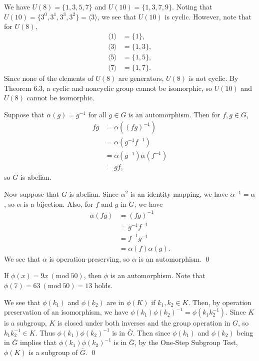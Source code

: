 \documentclass[11pt,letterpaper]{article}
\newcommand{\Mod}[1]{\ (\mathrm{mod}\ #1)}
\begin{document}
\begin{enumerate}
{\item[\textbf{6.4}] We have $U(8)=\{1,3,5,7\}$ and $U(10)=\{1,3,7,9\}$. Noting that $U(10)=\{3^0,3^1,3^3,3^2\}=\langle 3 \rangle$, we see that $U(10)$ is cyclic.
However, note that for $U(8)$,
\begin{align*}
    \langle 1 \rangle &= \{1\}, \\
    \langle 3 \rangle &= \{1,3\}, \\
    \langle 5 \rangle &= \{1,5\}, \\
    \langle 7 \rangle &= \{1,7\}.
\end{align*}
Since none of the elements of $U(8)$ are generators, $U(8)$ is not cyclic. By Theorem 6.3, a cyclic and noncyclic group cannot be isomorphic, so $U(10)$ and $U(8)$ cannot be isomorphic.


\item[\textbf{6.12}] Suppose that $\alpha(g)=g^{-1}$ for all $g\in{G}$ is an automorphism. Then for $f,g\in{G}$,
\begin{align*}
    fg &= \alpha((fg)^{-1}) \\
    &= \alpha(g^{-1}f^{-1}) \\
    &= \alpha(g^{-1})\alpha(f^{-1}) \\
    &= gf,
\end{align*}
so $G$ is abelian.

Now suppose that $G$ is abelian. Since $\alpha^2$ is an identity mapping, we have $\alpha^{-1}=\alpha$, so $\alpha$ is a bijection. Also, for $f$ and $g$ in $G$, we have
\begin{align*}
\alpha(fg) &= (fg)^{-1} \\
&= g^{-1}f^{-1} \\
&= f^{-1}g^{-1} \\
&= \alpha(f)\alpha(g).
\end{align*}
We see that $\alpha$ is operation-preserving, so $\alpha$ is an automorphism. \qed

\item[\textbf{6.32}] If $\phi(x)=9x \Mod{50}$, then $\phi$ is an automorphism. Note that $\phi(7)=63 \Mod{50} = 13$ holds.

\item[\textbf{6.34}] We see that $\phi(k_1)$ and $\phi(k_2)$ are in $\phi(K)$ if $k_1,k_2\in{K}$. Then, by operation preservation of an isomorphism, we have $\phi(k_1)\phi(k_2)^{-1}=\phi(k_1k_2^{-1})$. Since $K$ is a subgroup, $K$ is closed under both inverses and the group operation in $G$, so $k_1k_2^{-1}\in{K}$. Thus $\phi(k_1)\phi(k_2)^{-1}$ is in $\bar{G}$. Then since $\phi(k_1)$ and $\phi(k_2)$ being in $\bar{G}$ implies that $\phi(k_1)\phi(k_2)^{-1}$ is in $\bar{G}$, by the One-Step Subgroup Test, $\phi(K)$ is a subgroup of $\bar{G}$. \qed

}
\end{enumerate}
\end{document}
